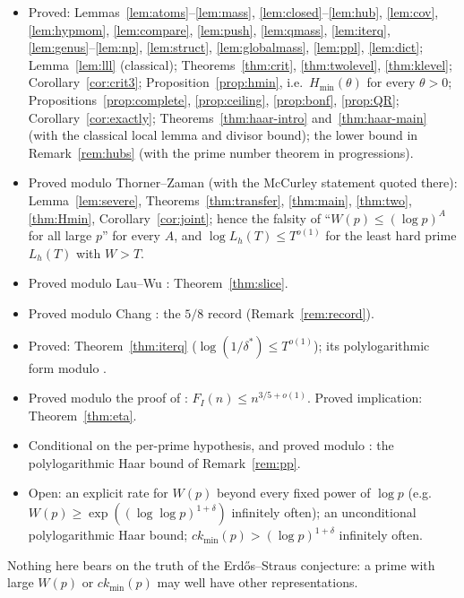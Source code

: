 \documentclass[11pt,reqno]{amsart}
\theoremstyle{definition}
\newcommand{\ckmin}{ck_{\min}}
\begin{document}
\begin{itemize}
\item Proved: Lemmas~\ref{lem:atoms}--\ref{lem:mass}, \ref{lem:closed}--\ref{lem:hub},
\ref{lem:cov}, \ref{lem:hypmom}, \ref{lem:compare}, \ref{lem:push},
\ref{lem:qmass}, \ref{lem:iterq}, \ref{lem:genus}--\ref{lem:np}, \ref{lem:struct}, \ref{lem:globalmass},
\ref{lem:ppl}, \ref{lem:dict}; Lemma~\ref{lem:lll} (classical);
Theorems~\ref{thm:crit}, \ref{thm:twolevel}, \ref{thm:klevel};
Corollary~\ref{cor:crit3}; Proposition~\ref{prop:hmin}, i.e.\ $H_{\min}(\theta)$
for every $\theta>0$; Propositions~\ref{prop:complete}, \ref{prop:ceiling},
\ref{prop:bonf}, \ref{prop:QR}; Corollary~\ref{cor:exactly};
Theorems~\ref{thm:haar-intro} and~\ref{thm:haar-main} (with the classical local lemma and divisor
bound); the lower bound in Remark~\ref{rem:hubs} (with the prime number theorem
in progressions).
\item Proved modulo Thorner--Zaman \cite{TZ} (with the McCurley statement quoted there):
Lemma~\ref{lem:severe}, Theorems~\ref{thm:transfer}, \ref{thm:main}, \ref{thm:two},
\ref{thm:Hmin}, Corollary~\ref{cor:joint}; hence the falsity of ``$W(p)\le(\log p)^A$
for all large $p$'' for every $A$, and $\log L_h(T)\le T^{o(1)}$ for the least hard
prime $L_h(T)$ with $W>T$.
\item Proved modulo Lau--Wu \cite[Prop.~5.1]{LW}: Theorem~\ref{thm:slice}.
\item Proved modulo Chang \cite[Cor.~11]{Chang}: the $5/8$ record
(Remark~\ref{rem:record}).
\item Proved: Theorem~\ref{thm:iterq} ($\log(1/\delta^*)\le T^{o(1)}$); its polylogarithmic
form modulo \cite[Prop.~1.4]{ET}.
\item Proved modulo the proof of \cite[Prop.~1.7]{ET}: $F_I(n)\le n^{3/5+o(1)}$.
Proved implication: Theorem~\ref{thm:eta}.
\item Conditional on the per-prime hypothesis, and proved modulo
\cite[Prop.~1.4]{ET}: the polylogarithmic Haar bound of Remark~\ref{rem:pp}.
\item Open: an explicit rate for $W(p)$ beyond every fixed power of $\log p$
(e.g.\ $W(p)\ge\exp((\log\log p)^{1+\delta})$ infinitely often); an
unconditional polylogarithmic Haar bound; $\ckmin(p)>(\log p)^{1+\delta}$
infinitely often.
\end{itemize}
Nothing here bears on the truth of the Erd\H{o}s--Straus conjecture: a prime with
large $W(p)$ or $\ckmin(p)$ may well have other representations.
\end{document}
